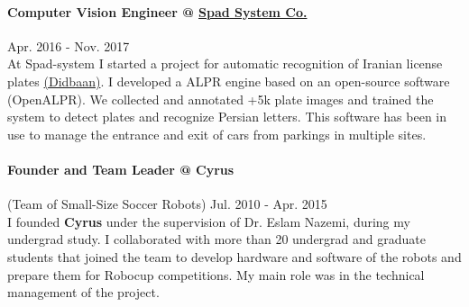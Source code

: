 \documentclass[10pt]{res}
\begin{document}
\begin{resume}
\paragraph{Computer Vision Engineer @ \href{http://www.spadsystem.com/}{Spad System Co.} } \hfill Apr. 2016 - Nov. 2017\\
At Spad-system I started a project for automatic recognition of Iranian license plates \href{http://didbaan.com}{(Didbaan)}. I developed a ALPR engine based on an open-source software (OpenALPR). We collected and annotated +5k plate images and trained the system to detect plates and recognize Persian letters. This software has been in use to manage the entrance and exit of cars from parkings in multiple sites.

\paragraph{Founder and Team Leader @ {Cyrus}}(Team of Small-Size Soccer Robots) \hfill Jul. 2010 - Apr. 2015\\
I founded \textbf{Cyrus} under the supervision of Dr. Eslam Nazemi, during my undergrad study. I collaborated with more than 20 undergrad and graduate students that joined the team to develop hardware and software of the robots and prepare them for Robocup competitions. My main role was in the technical management of the project. %






\end{resume}
\end{document}

